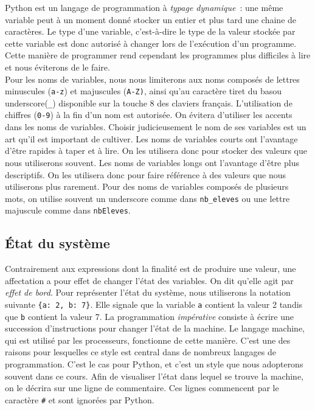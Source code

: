 \documentclass{magnoliaold}
\begin{document}
Python est un langage de programmation à \emph{typage dynamique}~: une même
variable peut à un moment donné stocker un entier et plus tard une chaine de caractères.
Le type d'une variable, c'est-à-dire le type de la valeur stockée par cette variable est
donc autorisé à changer lors de l'exécution d'un programme. Cette manière de programmer
rend cependant les programmes plus difficiles à lire et nous éviterons de le faire.\\

Pour les noms de variables, nous nous limiterons aux noms composés de lettres minuscules
(\verb_a-z_) et majuscules (\verb_A-Z)_, ainsi qu'au caractère \og tiret du bas\fg ou \og
underscore\fg (\verb-_-) disponible sur la touche 8 des claviers français. L'utilisation de chiffres (\verb_0-9_) à
la fin d'un nom est autorisée. On évitera
d'utiliser les accents dans les noms de variables. 
Choisir
judicieusement le nom de ses variables est un art qu'il est important de cultiver. Les noms
de variables courts ont l'avantage d'être rapides à taper et à lire. On les utilisera donc
pour stocker des valeurs que nous utiliserons souvent. Les noms de variables longs ont
l'avantage d'être plus descriptifs. On les utilisera donc pour faire référence à des valeurs
que nous utiliserons plus rarement. Pour des noms de variables composés de plusieurs mots, on utilise
souvent un underscore comme dans \verb-nb_eleves- ou une lettre majuscule comme dans
\verb_nbEleves_.

\subsection{État du système}

Contrairement aux expressions dont la finalité est de produire une valeur, une affectation
a pour effet de changer l'état des variables. On dit qu'elle agit par \emph{effet de bord}.
Pour représenter l'état du système, nous utiliserons la notation suivante
\verb_{a: 2, b: 7}_. Elle signale que la variable \verb_a_ contient la valeur 2 tandis que
\verb_b_ contient la valeur 7. La programmation \emph{impérative} consiste à écrire une
succession d'instructions pour changer l'état de la machine. Le langage machine, qui est utilisé par les processeurs, fonctionne de cette manière. C'est une des raisons pour
lesquelles ce style est central dans de nombreux langages de programmation. C'est le cas pour
Python, et c'est un style que nous adopterons souvent dans ce cours. Afin de visualiser l'état
dans lequel se trouve la machine, on le décrira sur
une ligne de commentaire. Ces lignes commencent par le caractère \verb_#_ et sont ignorées
par Python.\\
\end{document}
